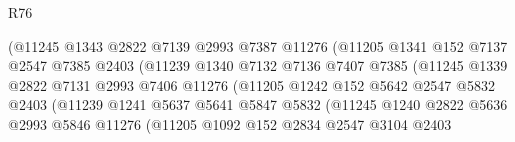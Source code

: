\begin{lexlean}{R76}
\begin{coremodule}
                                  (@11245
                                    @1343
                                    @2822
                                    @7139
                                    @2993
                                    @7387
                                    @11276
                                    (@11205
                                      @1341
                                      @152
                                      @7137
                                      @2547
                                      @7385
                                      @2403
                                      (@11239
                                        @1340
                                        @7132
                                        @7136
                                        @7407
                                        @7385
                                        (@11245
                                          @1339
                                          @2822
                                          @7131
                                          @2993
                                          @7406
                                          @11276
                                          (@11205
                                            @1242
                                            @152
                                            @5642
                                            @2547
                                            @5832
                                            @2403
                                            (@11239
                                              @1241
                                              @5637
                                              @5641
                                              @5847
                                              @5832
                                              (@11245
                                                @1240
                                                @2822
                                                @5636
                                                @2993
                                                @5846
                                                @11276
                                                (@11205
                                                  @1092
                                                  @152
                                                  @2834
                                                  @2547
                                                  @3104
                                                  @2403

\end{coremodule}
\end{lexlean}
